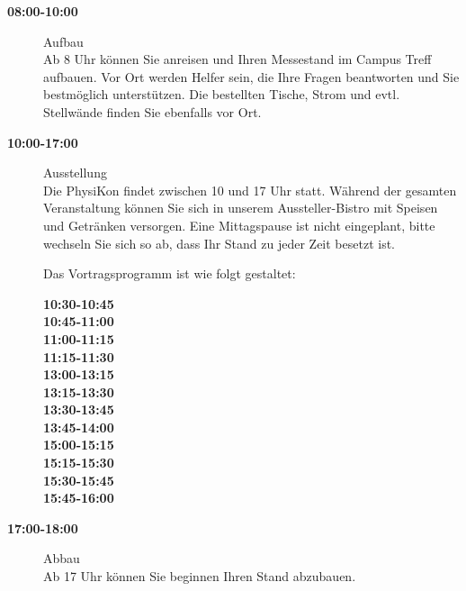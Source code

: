 \documentclass[
  paper=a4,
  fontsize=12pt,
  DIV=16,
  headheight=30pt,
  footheight=45pt,
  headinclude,
  parskip=half,
]{scrartcl}
\begin{document}
\begin{description}
  \item[\textbf{08:00-10:00}] Aufbau\\
    Ab 8 Uhr können Sie anreisen und Ihren Messestand im Campus Treff aufbauen. Vor Ort werden Helfer sein, die Ihre Fragen beantworten und Sie bestmöglich unterstützen. Die bestellten Tische, Strom und evtl. Stellwände finden Sie ebenfalls vor Ort.
  \item[\textbf{10:00-17:00}] Ausstellung\\
    Die PhysiKon findet zwischen 10 und 17 Uhr statt.
    Während der gesamten Veranstaltung können Sie sich in unserem Aussteller-Bistro mit Speisen und Getränken versorgen. Eine Mittagspause ist nicht eingeplant, bitte wechseln Sie sich so ab, dass Ihr Stand zu jeder Zeit besetzt ist.

    Das Vortragsprogramm ist wie folgt gestaltet:
    \begin{description}
      \item[\textbf{10:30-10:45}]
      \item[\textbf{10:45-11:00}]
      \item[\textbf{11:00-11:15}]
      \item[\textbf{11:15-11:30}]
      \item[\textbf{13:00-13:15}]
      \item[\textbf{13:15-13:30}]
      \item[\textbf{13:30-13:45}]
      \item[\textbf{13:45-14:00}]
      \item[\textbf{15:00-15:15}]
      \item[\textbf{15:15-15:30}]
      \item[\textbf{15:30-15:45}]
      \item[\textbf{15:45-16:00}]
    \end{description}
  \item[\textbf{17:00-18:00}] Abbau\\
    Ab 17 Uhr können Sie beginnen Ihren Stand abzubauen.
\end{description}
\end{document}
